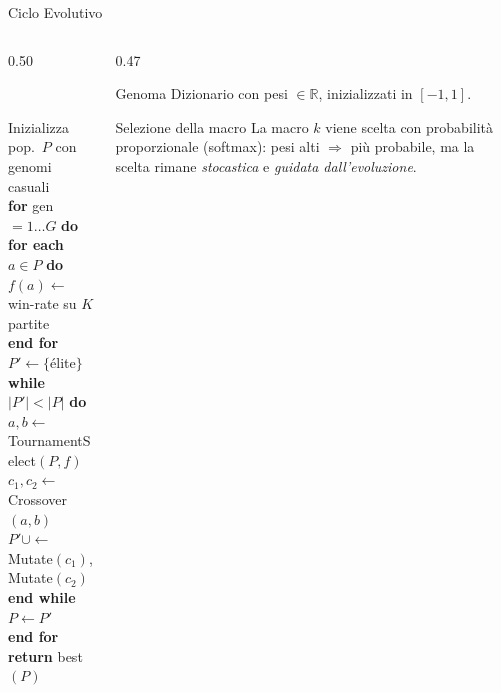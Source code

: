 \documentclass[9pt,serif,usenames,dvipsnames]{beamer}
\newenvironment{pseudocode}{%
	\begin{tabbing}%
		\hspace{1.4em}\=\hspace{1.4em}\=\hspace{1.4em}\=\kill%
	}{%
	\end{tabbing}%
}
\newcommand{\pckw}[1]{\textbf{#1}}
\begin{document}
	\begin{frame}{\centering Ciclo Evolutivo}
		\begin{columns}[T]
			\begin{column}{0.50\textwidth}
				\begin{tcolorbox}[
					enhanced,
					colback=gray!4,
					colframe=customgreen!70,
					boxrule=0.5pt,
					fonttitle=\bfseries\small,
					title={Ciclo evolutivo}]
					\footnotesize
					\begin{pseudocode}
						Inizializza pop.\ $P$ con genomi casuali \\[2pt]
						\pckw{for} gen $= 1\ldots G$ \pckw{do} \\
						\> \pckw{for each} $a \in P$ \pckw{do} \\
						\>\> $f(a) \leftarrow$ win-rate su $K$ partite \\
						\> \pckw{end for} \\[2pt]
						\> $P' \leftarrow \{$\'{e}lite$\}$ \\
						\> \pckw{while} $|P'| < |P|$ \pckw{do} \\
						\>\> $a,b \leftarrow$ TournamentSelect$(P,f)$ \\
						\>\> $c_1,c_2 \leftarrow$ Crossover$(a,b)$ \\
						\>\> $P' \cup\leftarrow$ Mutate$(c_1)$, Mutate$(c_2)$ \\
						\> \pckw{end while} \\
						\> $P \leftarrow P'$ \\
						\pckw{end for} \\[2pt]
						\pckw{return} best$(P)$
					\end{pseudocode}
				\end{tcolorbox}
			\end{column}
			\begin{column}{0.47\textwidth}
				\vspace{0.1cm}
				\begin{block}{Genoma}
					\small
					Dizionario \texttt{} con
					pesi $\in \mathbb{R}$, inizializzati in $[-1, 1]$.
				\end{block}
				\vspace{0.1cm}
				\begin{block}{Selezione della macro}
					\small
					La macro $k$ viene scelta con probabilità proporzionale
					(\alert{softmax}): pesi alti $\Rightarrow$ più probabile,
					ma la scelta rimane \emph{stocastica} e \emph{guidata dall'evoluzione}.
				\end{block}

\end{column}
\end{columns}
\end{frame}
\end{document}

